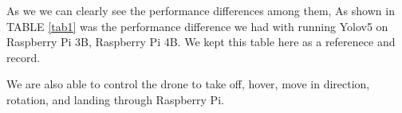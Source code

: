 As we  we can clearly see the performance differences among them, 
As shown in TABLE \ref{tab1} was the performance difference we had with running Yolov5 on Raspberry Pi 3B, Raspberry Pi 4B. We kept this table here as a referenece and record.
\begin{table}[H]
    \caption{Performance Comparison on running Yolov5}
    \begin{center}
        \label{tab1}
    \end{center}
\end{table}

We are also able to control the drone to take off, hover, move in direction, rotation, and landing through Raspberry Pi.